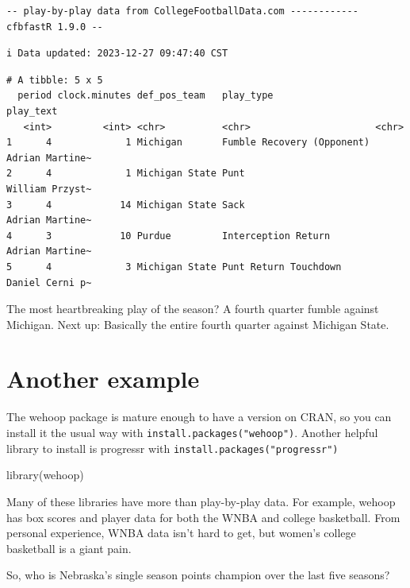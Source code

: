 \documentclass[
  letterpaper,
  DIV=11,
  numbers=noendperiod]{scrreprt}
\newenvironment{Shaded}{\begin{snugshade}}{\end{snugshade}}
\newcommand{\FunctionTok}[1]{\textcolor[rgb]{0.28,0.35,0.67}{#1}}
\newcommand{\NormalTok}[1]{\textcolor[rgb]{0.00,0.23,0.31}{#1}}
\begin{document}
\begin{verbatim}
-- play-by-play data from CollegeFootballData.com ------------ cfbfastR 1.9.0 --
\end{verbatim}

\begin{verbatim}
i Data updated: 2023-12-27 09:47:40 CST
\end{verbatim}

\begin{verbatim}
# A tibble: 5 x 5
  period clock.minutes def_pos_team   play_type                  play_text      
   <int>         <int> <chr>          <chr>                      <chr>          
1      4             1 Michigan       Fumble Recovery (Opponent) Adrian Martine~
2      4             1 Michigan State Punt                       William Przyst~
3      4            14 Michigan State Sack                       Adrian Martine~
4      3            10 Purdue         Interception Return        Adrian Martine~
5      4             3 Michigan State Punt Return Touchdown      Daniel Cerni p~
\end{verbatim}

The most heartbreaking play of the season? A fourth quarter fumble
against Michigan. Next up: Basically the entire fourth quarter against
Michigan State.

\hypertarget{another-example}{%
\section{Another example}\label{another-example}}

The wehoop package is mature enough to have a version on CRAN, so you
can install it the usual way with \texttt{install.packages("wehoop")}.
Another helpful library to install is progressr with
\texttt{install.packages("progressr")}

\begin{Shaded}
\begin{Highlighting}[]
\FunctionTok{library}\NormalTok{(wehoop)}
\end{Highlighting}
\end{Shaded}

Many of these libraries have more than play-by-play data. For example,
wehoop has box scores and player data for both the WNBA and college
basketball. From personal experience, WNBA data isn't hard to get, but
women's college basketball is a giant pain.

So, who is Nebraska's single season points champion over the last five
seasons?
\end{document}
